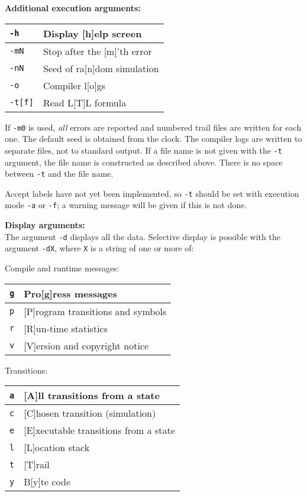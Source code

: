 \documentclass[11pt]{article}
\newcommand*{\p}[1]{\texttt{#1}}
\begin{document}
\textbf{Additional execution arguments:}
\begin{center}
\begin{tabular}{|l|p{}|}
\hline
\p{-h} & Display [h]elp screen\\\hline
\p{-mN} & Stop after the [m]'th error\\\hline
\p{-nN} & Seed of ra[n]dom simulation\\\hline
\p{-o} & Compiler l[o]gs\\\hline
\p{-t[f]} & Read L[T]L formula\\\hline
\end{tabular}
\end{center}
If \p{-m0} is used, \emph{all} errors are reported
and numbered trail files are written for each one.
The default seed is obtained from the clock. The compiler logs are
written to separate files, not to standard output. If a file name is not
given with the \p{-t} argument, the file name is constructed as
described above. There is no space between \p{-t} and the file name.

Accept labels have not yet been implemented, so \p{-t} should be set
with execution mode \p{-a} or \p{-f}; a warning message will be given if
this is not done.

\textbf{Display arguments:}\\
The argument \p{-d} displays all the data.
Selective display is possible with the argument
\p{-dX}, where \p{X} is a string of one or more of:

Compile and runtime messages:
\begin{center}
\begin{tabular}{|l|p{}|}
\hline
\p{g} & Pro[g]ress messages\\\hline
\p{p} & [P]rogram transitions and symbols\\\hline
\p{r} & [R]un-time statistics\\\hline
\p{v} & [V]ersion and copyright notice\\\hline
\end{tabular}
\end{center}

Transitions:
\begin{center}
\begin{tabular}{|l|p{}|}
\hline
\p{a} & [A]ll transitions from a state\\\hline
\p{c} & [C]hosen transition (simulation)\\\hline
\p{e} & [E]xecutable transitions from a state\\\hline
\p{l} & [L]ocation stack\\\hline
\p{t} & [T]rail\\\hline
\p{y} & B[y]te code\\\hline
\end{tabular}
\end{center}
\end{document}
